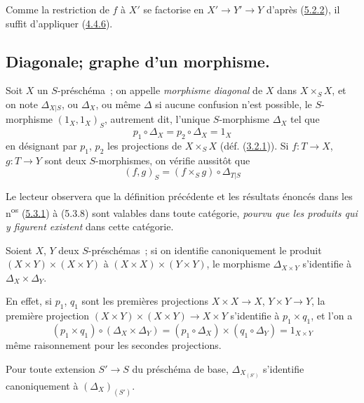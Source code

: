 Comme la restriction de $f$ à $X'$ se factorise en
$X'\to Y'\to Y$ d'après (\hyperref[I.5.2.2-fr]{5.2.2}), il suffit d'appliquer
(\hyperref[I.4.4.6-fr]{4.4.6}).

\subsection{Diagonale; graphe d'un morphisme.}
\label{subsection:I.5.3-fr}

\begin{env}[5.3.1]
\label{I.5.3.1-fr}
Soit $X$ un $S$-préschéma~; on appelle \emph{morphisme diagonal} de $X$ dans
$X\times_S X$, et on note $\Delta_{X|S}$, ou $\Delta_X$, ou même $\Delta$ si
aucune confusion n'est possible, le $S$-morphisme $(1_X,1_X)_S$, autrement
dit, l'unique $S$-morphisme $\Delta_X$ tel que
\[
  p_1\circ\Delta_X=p_2\circ\Delta_X=1_X
  \tag{5.3.1.1}\label{I.5.3.1.1-fr}
\]
en désignant par $p_1$, $p_2$ les projections de $X\times_S X$
(déf. (\hyperref[I.3.2.1-fr]{3.2.1})). Si $f:T\to X$, $g:T\to Y$ sont deux
$S$-morphismes, on vérifie aussitôt que
\[
  (f,g)_S=(f\times_S g)\circ\Delta_{T|S}
  \tag{5.3.1.2}\label{I.5.3.1.2-fr}
\]

Le lecteur observera que la définition précédente et les résultats énoncés
dans les n\textsuperscript{os} (\hyperref[I.5.3.1-fr]{5.3.1}) à (5.3.8) sont
valables dans toute catégorie, \emph{pourvu que les produits qui y figurent
existent} dans cette catégorie.
\end{env}

\begin{proposition}[5.3.2]
\label{I.5.3.2-fr}
Soient $X$, $Y$ deux $S$-préschémas~; si on identifie canoniquement le produit
$(X\times Y)\times(X\times Y)$ à $(X\times X)\times(Y\times Y)$, le morphisme
$\Delta_{X\times Y}$ s'identifie à $\Delta_X\times\Delta_Y$.
\end{proposition}

En effet, si $p_1$, $q_1$ sont les premières projections
$X\times X\to X$, $Y\times Y\to Y$, la première projection
$(X\times Y)\times(X\times Y)\to X\times Y$ s'identifie à $p_1\times q_1$,
et l'on a
\[
  (p_1\times q_1)\circ(\Delta_X\times\Delta_Y)
  =(p_1\circ\Delta_X)\times(q_1\circ\Delta_Y)=1_{X\times Y}
\]
même raisonnement pour les secondes projections.

\begin{corollary}[5.3.4]
\label{I.5.3.4-fr}
Pour toute extension $S'\to S$ du préschéma de base,
$\Delta_{X_{(S')}}$ s'identifie canoniquement à $(\Delta_X)_{(S')}$.
\end{corollary}

